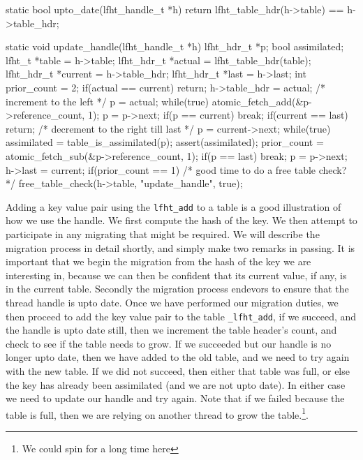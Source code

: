 \begin{center}
\begin{clisting}
static bool upto_date(lfht_handle_t *h){
  return lfht_table_hdr(h->table) == h->table_hdr;
}

static void update_handle(lfht_handle_t *h){
  lfht_hdr_t *p;
  bool assimilated;
  lfht_t *table = h->table;
  lfht_hdr_t *actual = lfht_table_hdr(table);
  lfht_hdr_t *current  = h->table_hdr;
  lfht_hdr_t *last = h->last;
  int prior_count = 2;
  if(actual == current){
    return;
  }
  h->table_hdr = actual;
  /* increment to the left */
  p = actual;
  while(true){
    atomic_fetch_add(&p->reference_count, 1);
    p = p->next;
    if(p == current){ break; }
  }
  if(current == last){  return; }
  /* decrement to the right till last */
  p = current->next;
  while(true){
    assimilated = table_is_assimilated(p);
    assert(assimilated);
    prior_count = atomic_fetch_sub(&p->reference_count, 1);
    if(p == last){ break; }
    p = p->next;
  }
  h->last = current;
  if(prior_count == 1){
    /* good time to do a free table check? */
    free_table_check(h->table, "update_handle", true);
  }
}
\end{clisting}
\end{center}

Adding a key value pair using the \texttt{lfht\_add} to a table is a good illustration of
how we use the handle. We first compute the hash of the key. We then attempt to participate in any
migrating that might be required. We will describe the migration process in detail shortly, and
simply make two remarks in passing. It is important that we begin the migration from the hash of the
key we are interesting in, because we can then be confident that its current value, if any, is in
the current table. Secondly the migration process endevors to ensure that the thread handle is upto date.
Once we have performed our migration duties, we then proceed to add the key value pair to the
table \texttt{\_lfht\_add}, if we succeed, and the handle is upto date still, then we increment
the table header's count, and check to see if the table needs to grow.
If we succeeded but our handle is no longer upto date, then we have added to the old table,
and we need to try again with the new table. If we did not succeed, then either that table
was full, or else the key has already been assimilated (and we are not  upto date). In either case
we need to update our handle and try again. Note that if we failed because the table is full, then
we are relying on another thread to grow the table.\footnote{We could spin for a long time here}.





